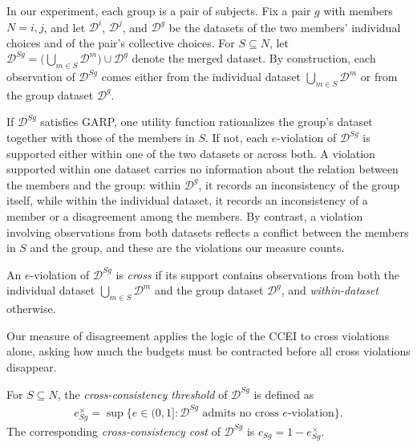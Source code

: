 \documentclass[11 pt]{article}
\begin{document}
In our experiment, each group is a pair of subjects. Fix a pair $g$ with members $N = {i,j}$, and let $\mathcal{D}^{i}$, $\mathcal{D}^{j}$, and $\mathcal{D}^{g}$ be the datasets of the two members' individual choices and of the pair's collective choices. For $S \subseteq N$, let $\mathcal{D}^{Sg} = \bigl( \bigcup_{m \in S} \mathcal{D}^{m} \bigr) \cup \mathcal{D}^{g}$ denote the merged dataset. By construction, each observation of $\mathcal{D}^{Sg}$ comes either from the individual dataset $\bigcup_{m \in S} \mathcal{D}^{m}$ or from the group dataset $\mathcal{D}^{g}$.

If $\mathcal{D}^{Sg}$ satisfies GARP, one utility function rationalizes the group's dataset together with those of the members in $S$. If not, each $e$-violation of $\mathcal{D}^{Sg}$ is supported either within one of the two datasets or across both. A violation supported within one dataset carries no information about the relation between the members and the group: within $\mathcal{D}^{g}$, it records an inconsistency of the group itself, while within the individual dataset, it records an inconsistency of a member or a disagreement among the members. By contrast, a violation involving observations from both datasets reflects a conflict between the members in $S$ and the group, and these are the violations our measure counts.

\begin{definition}\label{def:cross}\normalfont
An $e$-violation of $\mathcal{D}^{Sg}$ is \emph{cross} if its support contains observations from both the individual dataset $\bigcup_{m \in S} \mathcal{D}^{m}$ and the group dataset $\mathcal{D}^{g}$, and \emph{within-dataset} otherwise.
\end{definition}

Our measure of disagreement applies the logic of the CCEI to cross violations alone, asking how much the budgets must be contracted before all cross violations disappear.

\begin{definition}\label{def:cost}\normalfont
For $S \subseteq N$, the \emph{cross-consistency threshold} of $\mathcal{D}^{Sg}$ is defined as
\begin{align*}
e^{\times}_{Sg} = \sup\bigl\{ e \in (0,1] : \mathcal{D}^{Sg} \text{ admits no cross } e\text{-violation} \bigr\}.
\end{align*}
The corresponding \emph{cross-consistency cost} of $\mathcal{D}^{Sg}$ is $c_{Sg} = 1 - e^{\times}_{Sg}$.
\end{definition}
\end{document}
